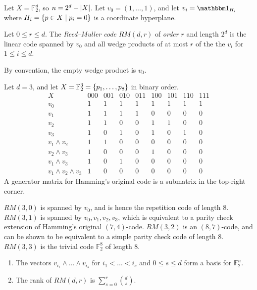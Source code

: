 Let \( X = \mathbb F_2^d \), so \( n = 2^d - \abs{X} \).
Let \( v_0 = (1, \dots, 1) \), and let \( v_i = \mathbbm 1_{H_i} \) where \( H_i = \qty{p \in X \mid p_i = 0} \) is a coordinate hyperplane.
\begin{definition}
    Let \( 0 \leq r \leq d \).
    The \emph{Reed--Muller code} \( RM(d,r) \) of \emph{order} \( r \) and length \( 2^d \) is the linear code spanned by \( v_0 \) and all wedge products of at most \( r \) of the the \( v_i \) for \( 1 \leq i \leq d \).
\end{definition}
By convention, the empty wedge product is \( v_0 \).
\begin{example}
    Let \( d = 3 \), and let \( X = \mathbb F_2^3 = \qty{p_1, \dots, p_8} \) in binary order.
    \[ \begin{array}{c|cccccccc}
        X & 000 & 001 & 010 & 011 & 100 & 101 & 110 & 111 \\\hline
        v_0 & 1 & 1 & 1 & 1 & 1 & 1 & 1 & 1 \\
        v_1 & 1 & 1 & 1 & 1 & 0 & 0 & 0 & 0 \\
        v_2 & 1 & 1 & 0 & 0 & 1 & 1 & 0 & 0 \\
        v_3 & 1 & 0 & 1 & 0 & 1 & 0 & 1 & 0 \\
        v_1 \wedge v_2 & 1 & 1 & 0 & 0 & 0 & 0 & 0 & 0 \\
        v_2 \wedge v_3 & 1 & 0 & 0 & 0 & 1 & 0 & 0 & 0 \\
        v_1 \wedge v_3 & 1 & 0 & 1 & 0 & 0 & 0 & 0 & 0 \\
        v_1 \wedge v_2 \wedge v_3 & 1 & 0 & 0 & 0 & 0 & 0 & 0 & 0
    \end{array} \]
    A generator matrix for Hamming's original code is a submatrix in the top-right corner.
\end{example}
\( RM(3,0) \) is spanned by \( v_0 \), and is hence the repetition code of length 8.
\( RM(3,1) \) is spanned by \( v_0, v_1, v_2, v_3 \), which is equivalent to a parity check extension of Hamming's original \( (7,4) \)-code.
\( RM(3,2) \) is an \( (8,7) \)-code, and can be shown to be equivalent to a simple parity check code of length 8.
\( RM(3,3) \) is the trivial code \( \mathbb F_2^8 \) of length 8.
\begin{theorem}
    \begin{enumerate}
        \item The vectors \( v_{i_1} \wedge \dots \wedge v_{i_s} \) for \( i_1 < \dots < i_s \) and \( 0 \leq s \leq d \) form a basis for \( \mathbb F_2^n \).
        \item The rank of \( RM(d,r) \) is \( \sum_{s=0}^r \binom{d}{s} \).
    \end{enumerate}
\end{theorem}
